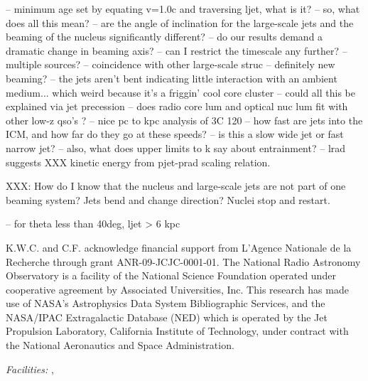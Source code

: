 \documentclass[11pt, preprint]{aastex}
\begin{document}
-- minimum age set by equating v=1.0c and traversing ljet, what is it?
-- so, what does all this mean?
-- are the angle of inclination for the large-scale jets and the
beaming of the nucleus significantly different?
-- do our results demand a dramatic change in beaming axis?
-- can I restrict the timescale any further?
-- multiple sources?
-- coincidence with other large-scale struc
-- definitely new beaming?
-- the jets aren't bent indicating little interaction with an
   ambient medium... which weird because it's a friggin' cool core
   cluster
-- could all this be explained via jet precession
   \citep{1982ApJ...262..478G}
-- does radio core lum and optical nuc lum fit with other low-z qso's
   \citep{1984AJ.....89.1658G}?
-- nice pc to kpc analysis of 3C 120 \citep{1987ApJ...316..546W}
-- how fast are jets into the ICM, and how far do they go at these speeds?
-- is this a slow wide jet or fast narrow jet?
-- also, what does upper limits to k say about entrainment?
-- lrad suggests XXX kinetic energy from \citet{pjet} pjet-prad
   scaling relation.

XXX: How do I know that the nucleus and large-scale jets are not part
of one beaming system? Jets bend and change direction? Nuclei stop and
restart.

-- for theta less than 40deg, ljet > 6 kpc

\acknowledgements

K.W.C. and C.F. acknowledge financial support from L'Agence Nationale
de la Recherche through grant ANR-09-JCJC-0001-01. The National Radio
Astronomy Observatory is a facility of the National Science Foundation
operated under cooperative agreement by Associated Universities,
Inc. This research has made use of NASA's Astrophysics Data System
Bibliographic Services, and the NASA/IPAC Extragalactic Database (NED)
which is operated by the Jet Propulsion Laboratory, California
Institute of Technology, under contract with the National Aeronautics
and Space Administration.

{\it Facilities:} , 





\clearpage


%

\end{document}
